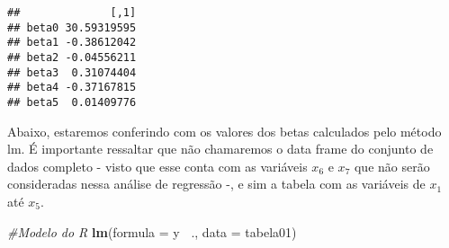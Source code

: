 \documentclass[
]{article}
\newenvironment{Shaded}{\begin{snugshade}}{\end{snugshade}}
\newcommand{\CommentTok}[1]{\textcolor[rgb]{0.56,0.35,0.01}{\textit{#1}}}
\newcommand{\DataTypeTok}[1]{\textcolor[rgb]{0.13,0.29,0.53}{#1}}
\newcommand{\DecValTok}[1]{\textcolor[rgb]{0.00,0.00,0.81}{#1}}
\newcommand{\KeywordTok}[1]{\textcolor[rgb]{0.13,0.29,0.53}{\textbf{#1}}}
\newcommand{\NormalTok}[1]{#1}
\newcommand{\OperatorTok}[1]{\textcolor[rgb]{0.81,0.36,0.00}{\textbf{#1}}}
\newcommand{\OtherTok}[1]{\textcolor[rgb]{0.56,0.35,0.01}{#1}}
\newcommand{\StringTok}[1]{\textcolor[rgb]{0.31,0.60,0.02}{#1}}
\begin{document}
\begin{Shaded}
\end{Shaded}

\begin{verbatim}
##              [,1]
## beta0 30.59319595
## beta1 -0.38612042
## beta2 -0.04556211
## beta3  0.31074404
## beta4 -0.37167815
## beta5  0.01409776
\end{verbatim}

Abaixo, estaremos conferindo com os valores dos betas calculados pelo
método lm. É importante ressaltar que não chamaremos o data frame do
conjunto de dados completo - visto que esse conta com as variáveis
\(x_6\) e \(x_7\) que não serão consideradas nessa análise de regressão
-, e sim a tabela com as variáveis de \(x_1\) até \(x_5\).

\begin{Shaded}
\begin{Highlighting}[]
\CommentTok{#Modelo do R}
\KeywordTok{lm}\NormalTok{(}\DataTypeTok{formula =}\NormalTok{ y }\OperatorTok{~}\NormalTok{., }\DataTypeTok{data =}\NormalTok{ tabela01)}
\end{Highlighting}
\end{Shaded}
\end{document}
